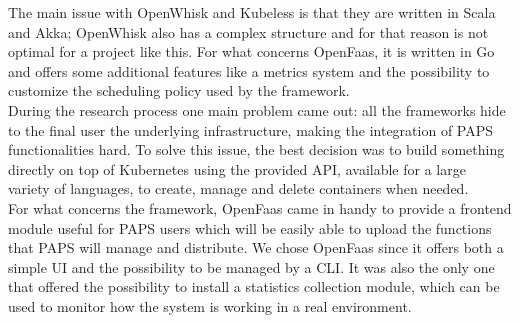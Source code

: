 \par
The main issue with OpenWhisk and Kubeless is 
that they are written in Scala and Akka; OpenWhisk also has a complex structure and for that reason 
is not optimal for a project like this. For what concerns OpenFaas, it is written
in Go and offers some additional features like a metrics system and the possibility to 
customize the scheduling policy used by the framework.
\\
During the research process one main  problem came out: all the frameworks hide to the final user 
the underlying infrastructure, making the integration of PAPS functionalities hard.
To solve this issue, the best decision was to build something directly on top of Kubernetes
using the provided API, available for a large variety of languages, to create, manage and 
delete containers when needed. \\
For what concerns the framework, OpenFaas came in handy to provide a frontend module 
useful for PAPS users which will be easily able to upload the functions that PAPS
will manage and distribute. We chose OpenFaas since it offers both a
simple UI and the possibility to be managed by a CLI. It was also the only one that offered the possibility to 
install a statistics collection module, which can be used to monitor how the
system is working in a real environment.


